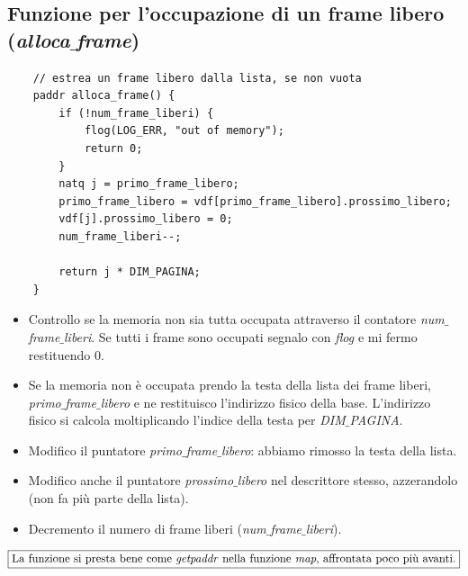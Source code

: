 \subsection{Funzione per l'occupazione di un frame libero (\emph{alloca$\_$frame})}
\small 
\begin{verbatim}
	// estrea un frame libero dalla lista, se non vuota
	paddr alloca_frame() {
		if (!num_frame_liberi) {
			flog(LOG_ERR, "out of memory");
			return 0;
		}
		natq j = primo_frame_libero;
		primo_frame_libero = vdf[primo_frame_libero].prossimo_libero;
		vdf[j].prossimo_libero = 0;
		num_frame_liberi--;
		
		return j * DIM_PAGINA;
	}
\end{verbatim}
\normalsize 
\begin{itemize}
	\item Controllo se la memoria non sia tutta occupata attraverso il contatore \emph{num$\_$frame$\_$liberi}. Se tutti i frame sono occupati segnalo con \emph{flog} e mi fermo restituendo $0$.
	\item Se la memoria non è occupata prendo la testa della lista dei frame liberi, \emph{primo$\_$frame$\_$libero} e ne restituisco l'indirizzo fisico della base. L'indirizzo fisico si calcola moltiplicando l'indice della testa per \emph{DIM$\_$PAGINA}.
	\item Modifico il puntatore \emph{primo$\_$frame$\_$libero}: abbiamo rimosso la testa della lista.  
	\item Modifico anche il puntatore \emph{prossimo$\_$libero} nel descrittore stesso, azzerandolo (non fa più parte della lista).
	\item Decremento il numero di frame liberi (\emph{num$\_$frame$\_$liberi}).
\end{itemize}
\[\boxed{\text{La funzione si presta bene come \emph{getpaddr} nella funzione \emph{map}, affrontata poco più avanti.}}\]
